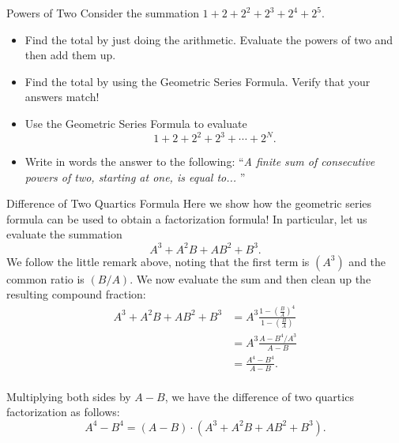\begin{exercise}{Powers of Two \Coffeecup \Coffeecup}
Consider the summation $1+2+2^2+2^3+2^4+2^5. $
\begin{itemize}
\item Find the total by just doing the arithmetic.  Evaluate the powers of two and then add them up. 

\vspace*{.5in}

\item Find the total by using the Geometric Series Formula.  Verify that your answers match! 

\vspace*{.5in}

\item Use the Geometric Series Formula to evaluate $$1+2+2^2+2^3+\cdots+2^N. $$

\vspace*{.5in}

\item Write in words the answer to the following: ``\emph{A finite sum of consecutive powers of two, starting at one, is equal to... }''
 
\vspace*{.5in}

\end{itemize}
\end{exercise}


\begin{example}{Difference of Two Quartics Formula}  Here we show how the geometric series formula can be used to obtain a factorization formula!  In particular, let us evaluate the summation $$A^3+A^2B+AB^2+B^3.$$  We follow the little remark above, noting that the first term is $\left(A^3\right)$ and the common ratio is $\left(B/A\right)$.  We now evaluate the sum and then clean up the resulting compound fraction:
\begin{align*}
A^3+A^2B+AB^2+B^3&=A^3\frac{1-\left(\frac{B}{A}\right)^4}{1-\left(\frac{B}{A}\right)}\\
&=A^3\frac{A-B^4/A^3}{A-B}\\
&=\frac{A^4-B^4}{A-B}.\\
\end{align*} 

Multiplying both sides by $A-B$, we have the difference of two quartics factorization as follows: $$A^4-B^4=(A-B)\cdot\left(A^3+A^2B+AB^2+B^3\right).$$
\end{example}

